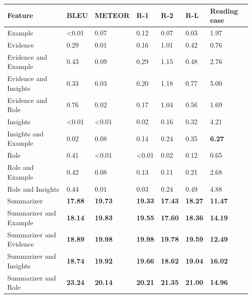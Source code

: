 \begin{tabular}{|l|l|l|l|l|l|l|}
\hline
\textbf{Feature} & BLEU & METEOR & R-1 & R-2 & R-L & Reading ease \\
 \hline
 Example & \textless{}0.01 & 0.07 & 0.12 & 0.07 & 0.03 & 1.97 \\
 \hline
 Evidence & 0.29 & 0.01 & 0.16 & 1.01 & 0.42 & 0.76 \\
 \hline
 Evidence and Example & 0.43 & 0.09 & 0.29 & 1.15 & 0.48 & 2.76 \\
 \hline
 Evidence and Insights & 0.33 & 0.03 & 0.20 & 1.18 & 0.77 & 5.00 \\
 \hline
 Evidence and Role & 0.76 & 0.02 & 0.17 & 1.04 & 0.56 & 1.69 \\
 \hline
 Insights & \textless{}0.01 & \textless{}0.01 & 0.02 & 0.16 & 0.32 & 4.21 \\
 \hline
 Insights and Example & 0.02 & 0.08 & 0.14 & 0.24 & 0.35 & \textbf{6.27} \\
 \hline
 Role & 0.41 & \textless{}0.01 & \textless{}0.01 & 0.02 & 0.12 & 0.65 \\
 \hline
 Role and Example & 0.42 & 0.08 & 0.13 & 0.11 & 0.21 & 2.68 \\
 \hline
 Role and Insights & 0.44 & 0.01 & 0.03 & 0.24 & 0.49 & 4.88 \\
 \hline
 Summarizer & \textbf{17.88} & \textbf{19.73} & \textbf{19.33} & \textbf{17.43} & \textbf{18.27} & \textbf{11.47} \\
 \hline
 Summarizer and Example & \textbf{18.14} & \textbf{19.83} & \textbf{19.55} & \textbf{17.60} & \textbf{18.36} & \textbf{14.19} \\
 \hline
 Summarizer and Evidence & \textbf{18.89} & \textbf{19.98} & \textbf{19.98} & \textbf{19.78} & \textbf{19.59} & \textbf{12.49} \\
 \hline
 Summarizer and Insights & \textbf{18.74} & \textbf{19.92} & \textbf{19.66} & \textbf{18.62} & \textbf{19.04} & \textbf{16.02} \\
 \hline
 Summarizer and Role & \textbf{23.24} & \textbf{20.14} & \textbf{20.21} & \textbf{21.35} & \textbf{21.00} & \textbf{14.96} \\
\hline
\end{tabular}
